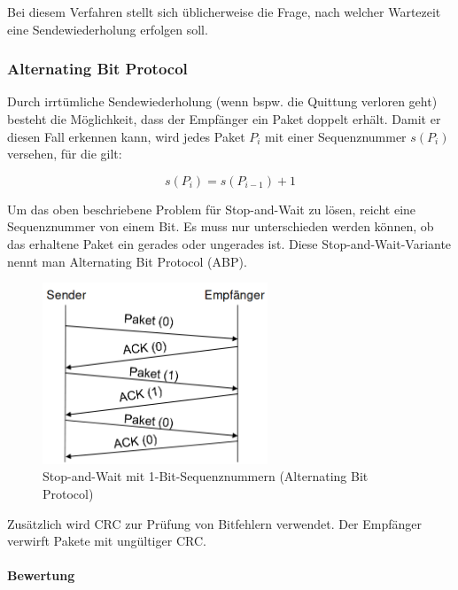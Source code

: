 \documentclass[a4paper, 14pt]{article}
\begin{document}
	Bei diesem Verfahren stellt sich üblicherweise die Frage, nach welcher Wartezeit eine Sendewiederholung erfolgen soll.

	\subsubsection{Alternating Bit Protocol}

	Durch irrtümliche Sendewiederholung (wenn bspw. die Quittung verloren geht) besteht die Möglichkeit, dass der Empfänger ein Paket doppelt erhält.
	Damit er diesen Fall erkennen kann, wird jedes Paket $P_i$ mit einer Sequenznummer $s(P_i)$ versehen, für die gilt:

	\begin{equation*}
		s(P_i) = s(P_{i-1}) + 1
	\end{equation*}

	Um das oben beschriebene Problem für Stop-and-Wait zu lösen, reicht eine Sequenznummer von einem Bit.
	Es muss nur unterschieden werden können, ob das erhaltene Paket ein gerades oder ungerades ist.
	Diese Stop-and-Wait-Variante nennt man Alternating Bit Protocol (ABP).

	\begin{figure}
		\begin{center}
			\includegraphics[width=0.6\textwidth]{images/04-stop-and-wait.png}
		\end{center}
		\caption{Stop-and-Wait mit 1-Bit-Sequenznummern (Alternating Bit Protocol)}
	\end{figure}

	Zusätzlich wird CRC zur Prüfung von Bitfehlern verwendet.
	Der Empfänger verwirft Pakete mit ungültiger CRC.

	\paragraph{Bewertung}
\end{document}
